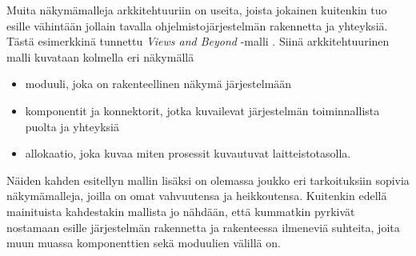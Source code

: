 \documentclass[finnish]{tktltiki2}
\numberwithin{table}{section}
\theoremstyle{definition}
\theoremstyle{remark}
\begin{document}

Muita näkymämalleja arkkitehtuuriin on useita, joista jokainen kuitenkin tuo esille vähintään jollain tavalla ohjelmistojärjestelmän rakennetta ja yhteyksiä. Tästä esimerkkinä tunnettu \textit{Views and Beyond} -malli \citep{Clements:2002:DSA:599933}. Siinä arkkitehtuurinen malli kuvataan kolmella eri näkymällä

\begin{itemize}
	\item moduuli, joka on rakenteellinen näkymä järjestelmään
	\item komponentit ja konnektorit, jotka kuvailevat järjestelmän toiminnallista puolta ja yhteyksiä
	\item allokaatio, joka kuvaa miten prosessit kuvautuvat laitteistotasolla.
\end{itemize}


Näiden kahden esitellyn mallin lisäksi on olemassa joukko eri tarkoituksiin sopivia näkymämalleja, joilla on omat vahvuutensa ja heikkoutensa. Kuitenkin edellä mainituista kahdestakin mallista jo nähdään, että kummatkin pyrkivät nostamaan esille järjestelmän rakennetta ja rakenteessa ilmeneviä suhteita, joita muun muassa komponenttien sekä moduulien välillä on.
\end{document}
